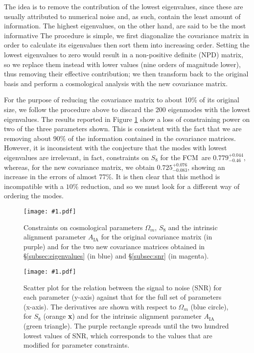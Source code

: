 \documentclass[aps, prd, twocolumn, superscriptaddress, nofootinbib, amssymb, amsmath]{revtex4-2}
\newcommand{\sfig}[3]{
	\texttt{[image: \#1.pdf]}
	\caption{#3}
	\label{fig:#1}
}
\newcommand{\Sfig}[3]{
	\begin{figure}[#1]
		\sfig{#2}{\columnwidth}{#3}
	\end{figure}
}
\newcommand{\Swide}[3]{
	\begin{figure*}[#1]
		\sfig{#2}{\textwidth}{#3}
	\end{figure*}
}
\newcommand{\rf}[1]{Figure \ref{fig:#1}}
\newcommand{\rssec}[1]{\S\ref{subsec:#1}}
\newcommand\full{the FCM}
\begin{document}
The idea is to remove the contribution of the lowest eigenvalues, since these are usually attributed to numerical noise and, as such, contain the least amount of information. The highest eigenvalues, on the other hand, are said to be the most informative \cite{Vogeley:1996} The procedure is simple, we first diagonalize the covariance matrix in order to calculate its eigenvalues then sort them into increasing order. Setting the lowest eigenvalues to zero would result in a non-positive definite (NPD) matrix, so we replace them instead with lower values (nine orders of magnitude lower), thus removing their effective contribution; we then transform back to the original basis and perform a cosmological analysis with the new covariance matrix.

For the purpose of reducing the covariance matrix to about 10\% of its original size, we follow the procedure above to discard the 200 eigenmodes with the lowest eigenvalues. The results reported in \rf{EigSNR-constraints_wmS8A} show a loss of constraining power on two of the three parameters shown. This is consistent with the fact that we are removing about 90\% of the information contained in the covariance matrices. However, it is inconsistent with the conjecture that the modes with lowest eigenvalues are irrelevant, in fact, constraints on $S_8$ for \full\ are $0.779^{+ 0.044}_{- 0.46}$, whereas, for the new covariance matrix, we obtain $0.725^{+ 0.076}_{- 0.083}$, showing an increase in the errors of almost 77\%. It is then clear that this method is incompatible with a $10\%$ reduction, and so we must look for a different way of ordering the modes.

\Sfig{thbp}{EigSNR-constraints_wmS8A}{Constraints on cosmological parameters $\Omega_m$, $S_8$ and the intrinsic alignment parameter $A_{\text{IA}}$ for the original covariance matrix (in purple) and for the two new covariance matrices obtained in \rssec{eigenvalues} (in blue) and \rssec{snr} (in magenta).}

\Swide{thbp}{SNR_cuts200}{Scatter plot for the relation between the signal to noise (SNR)  for each parameter (y-axis) against that for the full set of parameters (x-axis). The derivatives are shown with respect to $\Omega_m$ (blue circle), for $S_8$ (orange \textbf{x}) and for the intrinsic alignment parameter $A_{\text{IA}}$ (green triangle). The purple rectangle spreads until the two hundred lowest values of SNR, which corresponds to the values that are modified for parameter constraints.}

\end{document}
